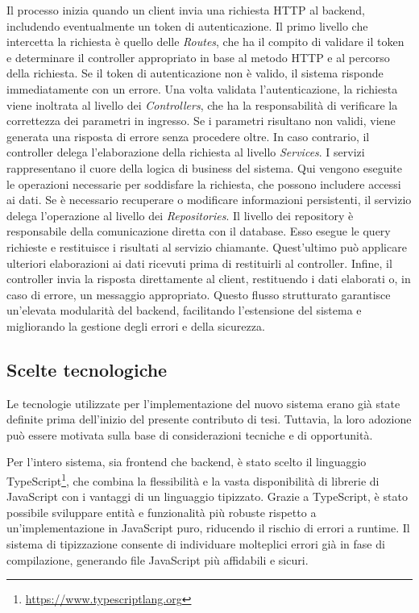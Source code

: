Il processo inizia quando un client invia una richiesta HTTP al backend, includendo eventualmente un token di autenticazione. Il primo livello che intercetta la richiesta è quello delle \textit{Routes}, che ha il compito di validare il token e determinare il controller appropriato in base al metodo HTTP e al percorso della richiesta. Se il token di autenticazione non è valido, il sistema risponde immediatamente con un errore.
%
Una volta validata l'autenticazione, la richiesta viene inoltrata al livello dei \textit{Controllers}, che ha la responsabilità di verificare la correttezza dei parametri in ingresso. Se i parametri risultano non validi, viene generata una risposta di errore senza procedere oltre. In caso contrario, il controller delega l'elaborazione della richiesta al livello \textit{Services}.
%
I servizi rappresentano il cuore della logica di business del sistema. Qui vengono eseguite le operazioni necessarie per soddisfare la richiesta, che possono includere accessi ai dati. Se è necessario recuperare o modificare informazioni persistenti, il servizio delega l'operazione al livello dei \textit{Repositories}.
%
Il livello dei repository è responsabile della comunicazione diretta con il database. Esso esegue le query richieste e restituisce i risultati al servizio chiamante. Quest'ultimo può applicare ulteriori elaborazioni ai dati ricevuti prima di restituirli al controller.
%
Infine, il controller invia la risposta direttamente al client, restituendo i dati elaborati o, in caso di errore, un messaggio appropriato. Questo flusso strutturato garantisce un'elevata modularità del backend, facilitando l'estensione del sistema e migliorando la gestione degli errori e della sicurezza.

\subsection{Scelte tecnologiche}
Le tecnologie utilizzate per l'implementazione del nuovo sistema erano già state definite prima dell'inizio del presente contributo di tesi. Tuttavia, la loro adozione può essere motivata sulla base di considerazioni tecniche e di opportunità.

Per l'intero sistema, sia frontend che backend, è stato scelto il linguaggio TypeScript\footnote{\url{https://www.typescriptlang.org}}, che combina la flessibilità e la vasta disponibilità di librerie di JavaScript con i vantaggi di un linguaggio tipizzato. Grazie a TypeScript, è stato possibile sviluppare entità e funzionalità più robuste rispetto a un'implementazione in JavaScript puro, riducendo il rischio di errori a runtime. Il sistema di tipizzazione consente di individuare molteplici errori già in fase di compilazione, generando file JavaScript più affidabili e sicuri.

